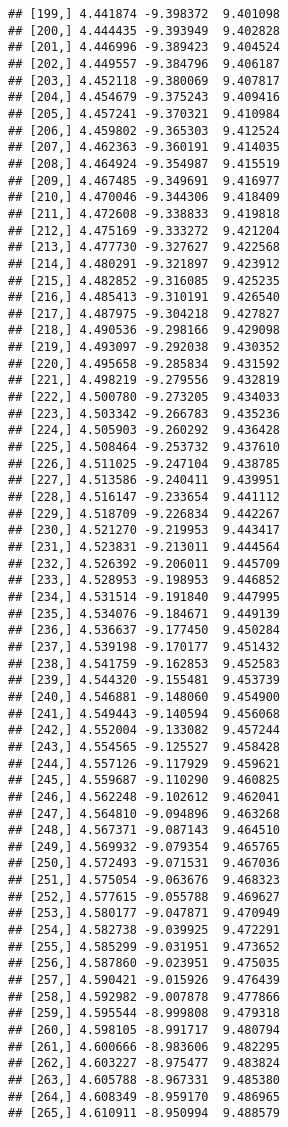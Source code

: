 \documentclass[]{book}
\theoremstyle{definition}
\theoremstyle{definition}
\theoremstyle{definition}
\theoremstyle{remark}
\begin{document}
\begin{verbatim}
## [199,] 4.441874 -9.398372  9.401098
## [200,] 4.444435 -9.393949  9.402828
## [201,] 4.446996 -9.389423  9.404524
## [202,] 4.449557 -9.384796  9.406187
## [203,] 4.452118 -9.380069  9.407817
## [204,] 4.454679 -9.375243  9.409416
## [205,] 4.457241 -9.370321  9.410984
## [206,] 4.459802 -9.365303  9.412524
## [207,] 4.462363 -9.360191  9.414035
## [208,] 4.464924 -9.354987  9.415519
## [209,] 4.467485 -9.349691  9.416977
## [210,] 4.470046 -9.344306  9.418409
## [211,] 4.472608 -9.338833  9.419818
## [212,] 4.475169 -9.333272  9.421204
## [213,] 4.477730 -9.327627  9.422568
## [214,] 4.480291 -9.321897  9.423912
## [215,] 4.482852 -9.316085  9.425235
## [216,] 4.485413 -9.310191  9.426540
## [217,] 4.487975 -9.304218  9.427827
## [218,] 4.490536 -9.298166  9.429098
## [219,] 4.493097 -9.292038  9.430352
## [220,] 4.495658 -9.285834  9.431592
## [221,] 4.498219 -9.279556  9.432819
## [222,] 4.500780 -9.273205  9.434033
## [223,] 4.503342 -9.266783  9.435236
## [224,] 4.505903 -9.260292  9.436428
## [225,] 4.508464 -9.253732  9.437610
## [226,] 4.511025 -9.247104  9.438785
## [227,] 4.513586 -9.240411  9.439951
## [228,] 4.516147 -9.233654  9.441112
## [229,] 4.518709 -9.226834  9.442267
## [230,] 4.521270 -9.219953  9.443417
## [231,] 4.523831 -9.213011  9.444564
## [232,] 4.526392 -9.206011  9.445709
## [233,] 4.528953 -9.198953  9.446852
## [234,] 4.531514 -9.191840  9.447995
## [235,] 4.534076 -9.184671  9.449139
## [236,] 4.536637 -9.177450  9.450284
## [237,] 4.539198 -9.170177  9.451432
## [238,] 4.541759 -9.162853  9.452583
## [239,] 4.544320 -9.155481  9.453739
## [240,] 4.546881 -9.148060  9.454900
## [241,] 4.549443 -9.140594  9.456068
## [242,] 4.552004 -9.133082  9.457244
## [243,] 4.554565 -9.125527  9.458428
## [244,] 4.557126 -9.117929  9.459621
## [245,] 4.559687 -9.110290  9.460825
## [246,] 4.562248 -9.102612  9.462041
## [247,] 4.564810 -9.094896  9.463268
## [248,] 4.567371 -9.087143  9.464510
## [249,] 4.569932 -9.079354  9.465765
## [250,] 4.572493 -9.071531  9.467036
## [251,] 4.575054 -9.063676  9.468323
## [252,] 4.577615 -9.055788  9.469627
## [253,] 4.580177 -9.047871  9.470949
## [254,] 4.582738 -9.039925  9.472291
## [255,] 4.585299 -9.031951  9.473652
## [256,] 4.587860 -9.023951  9.475035
## [257,] 4.590421 -9.015926  9.476439
## [258,] 4.592982 -9.007878  9.477866
## [259,] 4.595544 -8.999808  9.479318
## [260,] 4.598105 -8.991717  9.480794
## [261,] 4.600666 -8.983606  9.482295
## [262,] 4.603227 -8.975477  9.483824
## [263,] 4.605788 -8.967331  9.485380
## [264,] 4.608349 -8.959170  9.486965
## [265,] 4.610911 -8.950994  9.488579

\end{verbatim}
\end{document}
